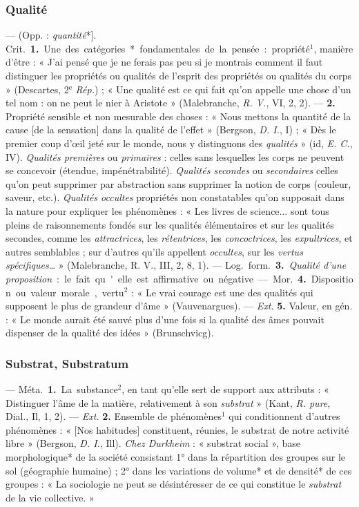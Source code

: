 \subsubsection{Qualité}
 — (Opp. : {\it quantité}*]. \si{Crit.} {\bf 1.} Une des
catégories* fondamentales de la pensée : propriété$^1$, manière d’être : «
J’ai pensé que je ne ferais pas peu si je montrais comment il faut distinguer
les propriétés ou qualités de l'esprit des propriétés ou qualités du corps
» (Descartes, 2$^\text{e}$ {\it Rép.}) ; « Une qualité est ce qui fait qu'on
appelle une chose d’un tel nom : on ne peut le nier à
Aristote » (Malebranche, {\it R. V.}, VI, 2, 2). — {\bf 2.} Propriété
sensible et non mesurable des choses : « Nous mettons la quantité de la cause
[de la sensation] dans la qualité de l'effet » (Bergson, {\it D. I.}, I) ; «
Dès le premier coup d'œil jeté sur le monde, nous y distinguons des {\it
qualités} » (id, {\it E. C.}, IV). {\it Qualités premières} ou {\it
primaires} : celles sans lesquelles les corps ne peuvent se concevoir
(étendue, impénétrabilité). {\it Qualités secondes} ou {\it secondaires}
celles qu'on peut supprimer par abstraction sans supprimer la notion de corps
(couleur, saveur, etc.). {\it Qualités occultes} propriétés non constatables
qu’on supposait dans la nature pour expliquer les phénomènes : « Les livres
de science... sont tous pleins de raisonnements fondés sur les qualités
élémentaires et sur les qualités secondes, comme les {\it attractrices}, les
{\it rétentrices}, les {\it concoctrices}, les {\it expultrices}, et autres
semblables ; sur d’autres qu'ils appellent {\it occultes}, sur les {\it
vertus spécifiques}… » (Malebranche, R. V., III, 2, 8, 1). — \si{Log.}
\si{form.} {\bf 3.} {\it Qualité d’une proposition} : le fait qu'elle est
affirmative ou négative.

— \si{Mor.} {\bf 4.} Disposition ou valeur morale, vertu$^2$ : « Le vrai
courage est une des qualités qui supposent le plus de grandeur d'âme
» (Vauvenargues). — {\it Ext.} {\bf 5.} Valeur, en gén. : « Le monde aurait
été sauvé plus d’une fois si la qualité des âmes pouvait dispenser de la
qualité des idées » (Brunschvicg).

\subsubsection{Substrat, Substratum}
 — \si{Méta.} {\bf 1.} La
substance$^2$, en tant qu’elle sert de
support aux attributs : « Distinguer l'âme de la matière, relativement à son
{\it substrat} » (Kant, {\it R. pure}, Dial., Il, 1, 2). — {\it Ext.}
{\bf 2.} Ensemble de phénomènes$^1$ qui conditionnent d’autres phénomènes :
« [Nos habitudes] constituent, réunies, le substrat de notre activité libre
» (Bergson, {\it D. I.}, Ill). {\it Chez Durkheim} : « substrat social »,
base morphologique* de la société consistant 1° dans la répartition des
groupes sur le sol (géographie humaine) ; 2° dans les variations de volume*
et de densité* de ces groupes : « La sociologie ne peut se désintéresser de
ce qui constitue le {\it substrat} de la vie collective. »

\subsubsection{}
